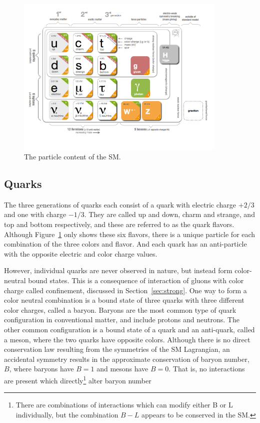 \begin{figure}[h]
  \centering
  \includegraphics[width=0.9\textwidth]{figures/particle_content.png}
  \caption{The particle content of the \acs*{SM}.}
  \label{fig:particle_content}
\end{figure}


\subsection{Quarks}

The three generations of quarks each consist of a quark with electric charge $+2/3$ and one with charge $-1/3$.
They are called up and down, charm and strange, and top and bottom respectively, and these are referred to as the quark flavors.
Although Figure~\ref{fig:particle_content} only shows these six flavors, there is a unique particle for each combination of the three colors and flavor.
And each quark has an anti-particle with the opposite electric and color charge values.

However, individual quarks are never observed in nature, but instead form color-neutral bound states. 
This is a consequence of interaction of gluons with color charge called confinement, discussed in Section~\ref{sec:strong}.
One way to form a color neutral combination is a bound state of three quarks with three different color charges, called a baryon.
Baryons are the most common type of quark configuration in conventional matter, and include protons and neutrons.
The other common configuration is a bound state of a quark and an anti-quark, called a meson, where the two quarks have opposite colors. 
Although there is no direct conservation law resulting from the symmetries of the \ac{SM} Lagrangian, an accidental symmetry results in the approximate conservation of baryon number, $B$, where baryons have $B=1$ and mesons have $B=0$. That is, no interactions are present which directly\footnote{\label{foot:bl}There are combinations of interactions which can modify either B or L individually, but the combination $B-L$ appears to be conserved in the \ac*{SM}.} alter baryon number

